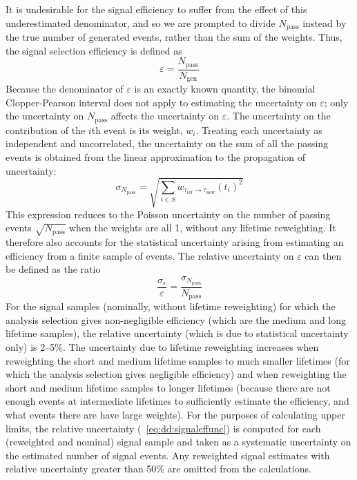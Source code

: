 It is undesirable for the signal efficiency to suffer from the effect of this underestimated denominator, and so we are prompted to divide $N_\text{pass}$ instead by the true number of generated events, rather than the sum of the weights.
Thus, the signal selection efficiency is defined as
\begin{equation}
  \varepsilon = \frac{N_\text{pass}}{N_\text{gen}}
  \label{eq:dd:signaleff}
\end{equation}
Because the denominator of $\varepsilon$ is an exactly known quantity, the binomial Clopper-Pearson interval does not apply to estimating the uncertainty on $\varepsilon$; only the uncertainty on $N_\text{pass}$ affects the uncertainty on $\varepsilon$.
The uncertainty on the contribution of the $i$th event is its weight, $w_i$.
Treating each uncertainty as independent and uncorrelated, the uncertainty on the sum of all the passing events is obtained from the linear approximation to the propagation of uncertainty:
\begin{equation}
  \sigma_{N_\text{pass}} = \sqrt{\sum_{i\in S}{w_{\tau_\text{ref}\to\tau_\text{new}}(t_i)^2}}
  \label{eq:dd:npassunc}
\end{equation}
This expression reduces to the Poisson uncertainty on the number of passing events $\sqrt{N_\text{pass}}$ when the weights are all 1, \ie without any lifetime reweighting.
It therefore also accounts for the statistical uncertainty arising from estimating an efficiency from a finite sample of events.
The relative uncertainty on $\varepsilon$ can then be defined as the ratio
\begin{equation}
  \frac{\sigma_\varepsilon}{\varepsilon} = \frac{\sigma_{N_\text{pass}}}{N_\text{pass}}
  \label{eq:dd:signaleffunc}
\end{equation}
For the signal samples (nominally, without lifetime reweighting) for which the analysis selection gives non-negligible efficiency (which are the medium and long lifetime samples), the relative uncertainty (which is due to statistical uncertainty only) is 2--5\%.
The uncertainty due to lifetime reweighting increases when reweighting the short and medium lifetime samples to much smaller lifetimes (for which the analysis selection gives negligible efficiency) and when reweighting the short and medium lifetime samples to longer lifetimes (because there are not enough events at intermediate lifetimes to sufficiently estimate the efficiency, and what events there are have large weights).
For the purposes of calculating upper limits, the relative uncertainty (\Eq~\ref{eq:dd:signaleffunc}) is computed for each (reweighted and nominal) signal sample and taken as a systematic uncertainty on the estimated number of signal events.
Any reweighted signal estimates with relative uncertainty greater than 50\% are omitted from the calculations.

